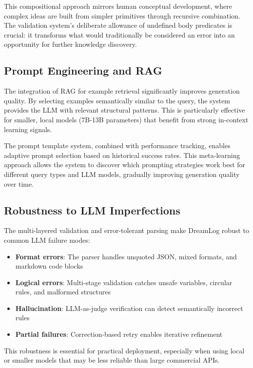 \documentclass[10pt,conference]{IEEEtran}
\begin{document}
This compositional approach mirrors human conceptual development, where complex ideas are built from simpler primitives through recursive combination. The validation system's deliberate allowance of undefined body predicates is crucial: it transforms what would traditionally be considered an error into an opportunity for further knowledge discovery.

\subsection{Prompt Engineering and RAG}

The integration of RAG for example retrieval significantly improves generation quality. By selecting examples semantically similar to the query, the system provides the LLM with relevant structural patterns. This is particularly effective for smaller, local models (7B-13B parameters) that benefit from strong in-context learning signals.

The prompt template system, combined with performance tracking, enables adaptive prompt selection based on historical success rates. This meta-learning approach allows the system to discover which prompting strategies work best for different query types and LLM models, gradually improving generation quality over time.

\subsection{Robustness to LLM Imperfections}

The multi-layered validation and error-tolerant parsing make DreamLog robust to common LLM failure modes:

\begin{itemize}
\item \textbf{Format errors}: The parser handles unquoted JSON, mixed formats, and markdown code blocks
\item \textbf{Logical errors}: Multi-stage validation catches unsafe variables, circular rules, and malformed structures
\item \textbf{Hallucination}: LLM-as-judge verification can detect semantically incorrect rules
\item \textbf{Partial failures}: Correction-based retry enables iterative refinement
\end{itemize}

This robustness is essential for practical deployment, especially when using local or smaller models that may be less reliable than large commercial APIs.
\end{document}
